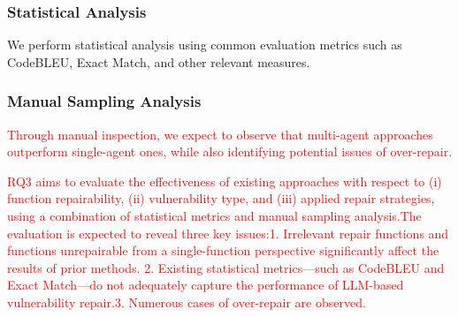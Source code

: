 \subsubsection{Statistical Analysis}
We perform statistical analysis using common evaluation metrics such as CodeBLEU, Exact Match, and other relevant measures.

\subsubsection{Manual Sampling Analysis}
\textcolor{red}{Through manual inspection, we expect to observe that multi-agent approaches outperform single-agent ones, while also identifying potential issues of over-repair.}








\begin{tcolorbox}[colback=gray!5!white, colframe=black!75, title=Answer to RQ3]

\textcolor{red}{RQ3 aims to evaluate the effectiveness of existing approaches with respect to (i) function repairability, (ii) vulnerability type, and (iii) applied repair strategies, using a combination of statistical metrics and manual sampling analysis.The evaluation is expected to reveal three key issues:1.	Irrelevant repair functions and functions unrepairable from a single-function perspective significantly affect the results of prior methods. 2.	Existing statistical metrics—such as CodeBLEU and Exact Match—do not adequately capture the performance of LLM-based vulnerability repair.3.	Numerous cases of over-repair are observed.}



\end{tcolorbox}
